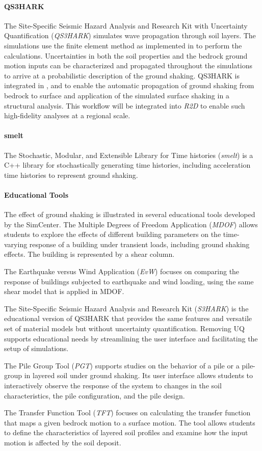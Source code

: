 \paragraph{QS3HARK} The Site-Specific Seismic Hazard Analysis and Research Kit with Uncertainty Quantification (\emph{QS3HARK}) simulates wave propagation through soil layers. The simulations use the finite element method as implemented in  to perform the calculations. Uncertainties in both the soil properties and the bedrock ground motion inputs can be characterized and propagated throughout the simulations to arrive at a probabilistic description of the ground shaking. QS3HARK is integrated in , and  to enable the automatic propagation of ground shaking from bedrock to surface and application of the simulated surface shaking in a structural analysis. This workflow will be integrated into \emph{R2D} to enable such high-fidelity analyses at a regional scale.

\paragraph{smelt} The Stochastic, Modular, and Extensible Library for Time histories (\emph{smelt}) is a C++ library for stochastically generating time histories, including acceleration time histories to represent ground shaking.

\paragraph{Educational Tools}
The effect of ground shaking is illustrated in several educational tools developed by the SimCenter. The Multiple Degrees of Freedom Application (\emph{MDOF}) allows students to explore the effects of different building parameters on the time-varying response of a building under transient loads, including ground shaking effects. The building is represented by a shear column. 

\noindent The Earthquake versus Wind Application (\emph{EvW}) focuses on comparing the response of buildings subjected to earthquake and wind loading, using the same shear model that is applied in MDOF.

\noindent The Site-Specific Seismic Hazard Analysis and Research Kit (\emph{S3HARK}) is the educational version of QS3HARK that provides the same features and versatile set of material models but without uncertainty quantification. Removing UQ supports educational needs by streamlining the user interface and facilitating the setup of simulations.

\noindent The Pile Group Tool (\emph{PGT}) supports studies on the behavior of a pile or a pile-group in layered soil under ground shaking. Its user interface allows students to interactively observe the response of the system to changes in the soil characteristics, the pile configuration, and the pile design.

\noindent The Transfer Function Tool (\emph{TFT}) focuses on calculating the transfer function that maps a given bedrock motion to a surface motion. The tool allows students to define the characteristics of layered soil profiles and examine how the input motion is affected by the soil deposit.

